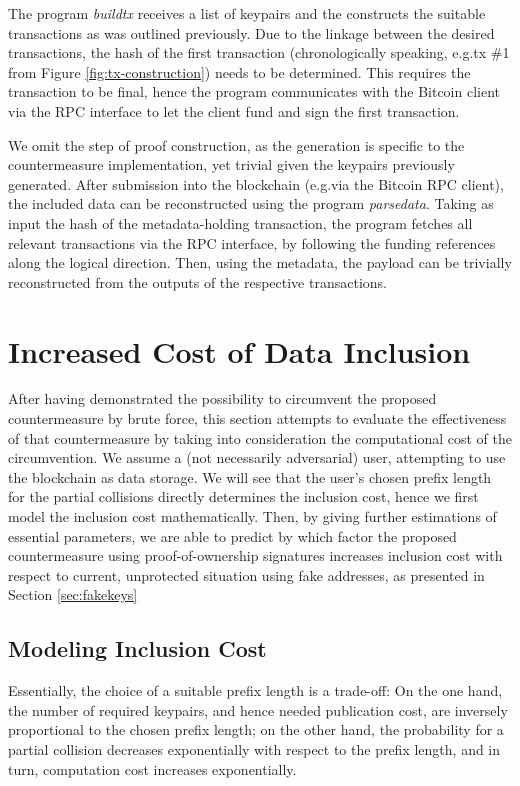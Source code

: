 \documentclass[a4paper,11pt,titlepage]{scrbook}
\begin{document}
The program \emph{buildtx} receives a list of keypairs and the constructs the suitable transactions as was outlined previously.
Due to the linkage between the desired transactions, the hash of the first transaction (chronologically speaking, e.g.\@ tx \#1 from Figure \ref{fig:tx-construction}) needs to be determined.
This requires the transaction to be final, hence the program communicates with the Bitcoin client via the RPC interface to let the client fund and sign the first transaction.

We omit the step of proof construction, as the generation is specific to the countermeasure implementation, yet trivial given the keypairs previously generated.
After submission into the blockchain (e.g.\@ via the Bitcoin RPC client), the included data can be reconstructed using the program \emph{parsedata}.
Taking as input the hash of the metadata-holding transaction, the program fetches all relevant transactions via the RPC interface, by following the funding references along the logical direction.
Then, using the metadata, the payload can be trivially reconstructed from the outputs of the respective transactions.


\chapter{Increased Cost of Data Inclusion}\label{chap:evaluation}

After having demonstrated the possibility to circumvent the proposed countermeasure by brute force, this section attempts to evaluate the effectiveness of that countermeasure by taking into consideration the computational cost of the circumvention.
We assume a (not necessarily adversarial) user, attempting to use the blockchain as data storage.
We will see that the user's chosen prefix length for the partial collisions directly determines the inclusion cost, hence we first model the inclusion cost mathematically. Then, by giving further estimations of essential parameters, we are able to predict by which factor the proposed countermeasure using proof-of-ownership signatures increases inclusion cost with respect to current, unprotected situation using fake addresses, as presented in Section \ref{sec:fakekeys}

\section{Modeling Inclusion Cost}

Essentially, the choice of a suitable prefix length is a trade-off:
On the one hand, the number of required keypairs, and hence needed publication cost, are inversely proportional to the chosen prefix length;
on the other hand, the probability for a partial collision decreases exponentially with respect to the prefix length, and in turn, computation cost increases exponentially.
\end{document}
